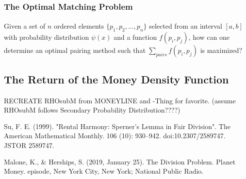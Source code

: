 \documentclass[12pt,letterpaper]{article}
\begin{document}
\begin{tcolorbox}
\subsubsection*{The Optimal Matching Problem}
\paragraph{} Given a set of $n$ ordered elements $\{p_1, p_2, \hdots , p_n\}$ selected from an interval $[a,b]$ with probability distribution $\psi(x)$ and a function $f(p_i,p_j)$, how can one determine an optimal pairing method such that $\sum_{pairs} f(p_i,p_j)$ is maximized?
\end{tcolorbox}

\subsection{The Return of the Money Density Function}

\paragraph{} RECREATE RHOsubM from MONEYLINE and -Thing for favorite. (assume RHOsubM follows Secondary Probability Distribution????)

\begin{thebibliography}{9}
Su, F. E. (1999). "Rental Harmony: Sperner's Lemma in Fair Division". The American Mathematical Monthly. 106 (10): 930–942. doi:10.2307/2589747. JSTOR 2589747.

Malone, K., \& Herships, S. (2019, January 25). The Division Problem. Planet Money. episode, New York City, New York; National Public Radio.
\end{thebibliography}
\end{document}
